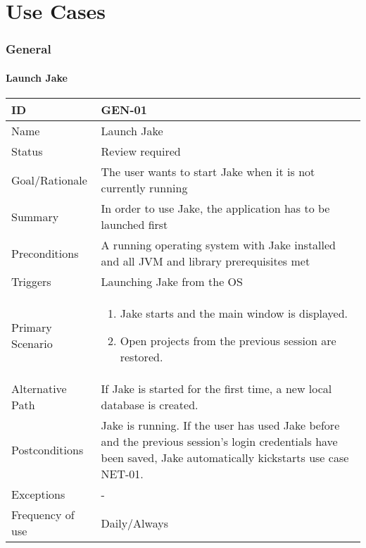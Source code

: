 \part{Use Cases}
\section{General}

\def\ucreset{
\def\ucid{-}
\def\ucname{-}
\def\ucstatus{-} %
\def\ucrationale{-}
\def\ucsummary{-}
\def\ucpreconditions{-}
\def\uctriggers{-}
\def\ucprimaryscenario{-}
\def\ucalternativepath{-}
\def\ucexceptions{-}
\def\ucpostconditions{-}
\def\ucfrequency{-}
}

\def\ucprint{
\subsection{\ucname}
\begin{tabular}{|p{3cm}|p{12cm}|}
\hline
ID & \ucid \\ 
\hline 
Name & \ucname \\
\hline
Status & \ucstatus \\ 
\hline 
Goal/Rationale & \ucrationale \\ 
\hline 
Summary & \ucsummary \\ 
\hline
Preconditions & \ucpreconditions \\
\hline
Triggers & \uctriggers \\
\hline
Primary Scenario & \ucprimaryscenario \\
\hline
Alternative Path & \ucalternativepath \\
\hline
Postconditions & \ucpostconditions  \\
\hline
Exceptions & \ucexceptions \\
\hline
Frequency of use & \ucfrequency  \\
\hline
\end{tabular}
}


\ucreset
\def\ucid{GEN-01}
\def\ucname{Launch Jake}
\def\ucstatus{Review required} %
\def\ucrationale{The user wants to start Jake when it is not currently running}
\def\ucsummary{In order to use Jake, the application has to be launched first}
\def\ucpreconditions{A running operating system with Jake installed and all JVM and library prerequisites met}
\def\uctriggers{Launching Jake from the OS}
\def\ucprimaryscenario{
\begin{enumerate}
\item Jake starts and the main window is displayed.
\item Open projects from the previous session are restored.
\end{enumerate}}
\def\ucalternativepath{If Jake is started for the first time, a new local database is created.}
\def\ucpostconditions{Jake is running. If the user has used Jake before and the previous session's login credentials have been saved, Jake automatically kickstarts use case NET-01.}
\def\ucfrequency{Daily/Always}
\ucprint

